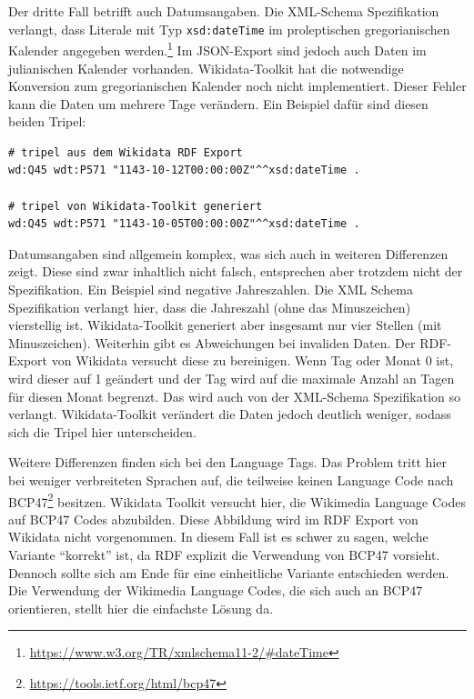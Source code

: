 Der dritte Fall betrifft auch Datumsangaben.
Die XML-Schema Spezifikation verlangt, dass Literale mit Typ \verb|xsd:dateTime| im proleptischen gregorianischen Kalender angegeben werden.\footnote{\url{https://www.w3.org/TR/xmlschema11-2/\#dateTime}}
Im JSON-Export sind jedoch auch Daten im julianischen Kalender vorhanden.
Wikidata-Toolkit hat die notwendige Konversion zum gregorianischen Kalender noch nicht implementiert.
Dieser Fehler kann die Daten um mehrere Tage verändern. Ein Beispiel dafür sind diesen beiden Tripel:
\begin{lstlisting}[language=SPARQL]
# tripel aus dem Wikidata RDF Export
wd:Q45 wdt:P571 "1143-10-12T00:00:00Z"^^xsd:dateTime .

# tripel von Wikidata-Toolkit generiert
wd:Q45 wdt:P571 "1143-10-05T00:00:00Z"^^xsd:dateTime .
\end{lstlisting}

Datumsangaben sind allgemein komplex, was sich auch in weiteren Differenzen zeigt. 
Diese sind zwar inhaltlich nicht falsch, entsprechen aber trotzdem nicht der Spezifikation.
Ein Beispiel sind negative Jahreszahlen.
Die XML Schema Spezifikation verlangt hier, dass die Jahreszahl (ohne das Minuszeichen) vierstellig ist.
Wikidata-Toolkit generiert aber insgesamt nur vier Stellen (mit Minuszeichen).
Weiterhin gibt es Abweichungen bei invaliden Daten.
Der RDF-Export von Wikidata versucht diese zu bereinigen.
Wenn Tag oder Monat 0 ist, wird dieser auf 1 geändert und der Tag wird auf die maximale Anzahl an Tagen für diesen Monat begrenzt.
Das wird auch von der XML-Schema Spezifikation so verlangt.
Wikidata-Toolkit verändert die Daten jedoch deutlich weniger, sodass sich die Tripel hier unterscheiden.

Weitere Differenzen finden sich bei den Language Tags.
Das Problem tritt hier bei weniger verbreiteten Sprachen auf, die teilweise keinen Language Code nach BCP47\footnote{\url{https://tools.ietf.org/html/bcp47}} besitzen.
Wikidata Toolkit versucht hier, die Wikimedia Language Codes auf BCP47 Codes abzubilden.
Diese Abbildung wird im RDF Export von Wikidata nicht vorgenommen.
In diesem Fall ist es schwer zu sagen, welche Variante "`korrekt"' ist, da RDF explizit die Verwendung von BCP47 vorsieht.
Dennoch sollte sich am Ende für eine einheitliche Variante entschieden werden.
Die Verwendung der Wikimedia Language Codes, die sich auch an BCP47 orientieren, stellt hier die einfachste Lösung da.

